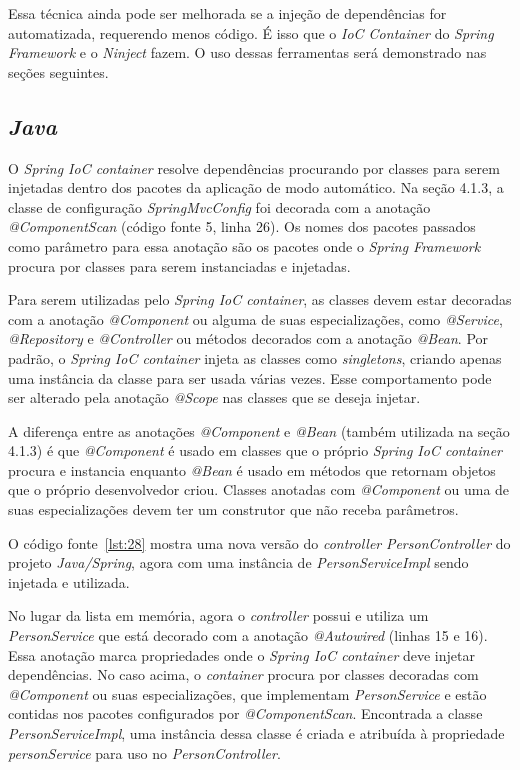 Essa técnica ainda pode ser melhorada se a injeção de dependências for automatizada, requerendo menos código. É isso que o \textit{IoC Container} do \textit{Spring Framework} e o \textit{Ninject} fazem. O uso dessas ferramentas será demonstrado nas seções seguintes.

\subsection{\textit{Java}}

O \textit{Spring IoC container} resolve dependências procurando por classes para serem injetadas dentro dos pacotes da aplicação de modo automático. Na seção 4.1.3, a classe de configuração \textit{SpringMvcConfig} foi decorada com a anotação \textit{@ComponentScan} (código fonte 5, linha 26). Os nomes dos pacotes passados como parâmetro para essa anotação são os pacotes onde o \textit{Spring Framework} procura por classes para serem instanciadas e injetadas.

Para serem utilizadas pelo \textit{Spring IoC container}, as classes devem estar decoradas com a anotação \textit{@Component} ou alguma de suas especializações, como \textit{@Service}, \textit{@Repository} e \textit{@Controller} ou métodos decorados com a anotação \textit{@Bean}. Por padrão, o \textit{Spring IoC container} injeta as classes como \textit{singletons}, criando apenas uma instância da classe para ser usada várias vezes. Esse comportamento pode ser alterado pela anotação \textit{@Scope} nas classes que se deseja injetar.

A diferença entre as anotações \textit{@Component} e \textit{@Bean} (também utilizada na seção 4.1.3) é que \textit{@Component} é usado em classes que o próprio \textit{Spring IoC container} procura e instancia enquanto \textit{@Bean} é usado em métodos que retornam objetos que o próprio desenvolvedor criou. Classes anotadas com \textit{@Component} ou uma de suas especializações devem ter um construtor que não receba parâmetros.

O código fonte~\ref{lst:28} mostra uma nova versão do \textit{controller} \textit{PersonController} do projeto \textit{Java/Spring}, agora com uma instância de \textit{PersonServiceImpl} sendo injetada e utilizada.


No lugar da lista em memória, agora o \textit{controller} possui e utiliza um \textit{PersonService} que  está decorado com a anotação \textit{@Autowired} (linhas 15 e 16). Essa anotação marca propriedades onde o \textit{Spring IoC container} deve injetar dependências. No caso acima, o \textit{container} procura por classes decoradas com \textit{@Component} ou suas especializações, que implementam \textit{PersonService} e estão contidas nos pacotes configurados por \textit{@ComponentScan}. Encontrada a classe \textit{PersonServiceImpl}, uma instância dessa classe é criada e atribuída à propriedade \textit{personService} para uso no \textit{PersonController}.

